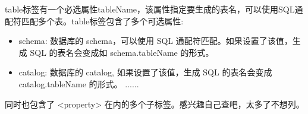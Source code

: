 table标签有一个必选属性tableName，该属性指定要生成的表名，可以使用SQL通配符匹配多个表。table标签包含了多个可选属性:

\begin{itemize}
    \item schema: 数据库的 schema，可以使用 SQL 通配符匹配。如果设置了该值，生成 SQL 的表名会变成如 schema.tableName 的形式。
    \item catalog: 数据库的 catalog, 如果设置了该值，生成 SQL 的表名会变成 catalog.tableName 的形式。
    ...... 
\end{itemize}

同时也包含了 <property> 在内的多个子标签。感兴趣自己查吧，太多了不想列。

\newpage